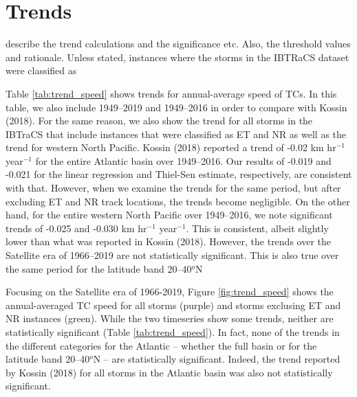 \documentclass[wcd,manuscript]{copernicus}
\begin{document}
\section{Trends}

describe the trend calculations and the significance etc. Also, the threshold values and rationale. Unless stated, instances where the storms in the IBTRaCS dataset were classified as



Table \ref{tab:trend_speed} shows trends for annual-average speed of TCs. In this table, we also include 1949--2019 and 1949--2016 in order to compare with Kossin (2018). For the same reason, we also show the trend for all storms in the IBTraCS that include instances that were classified as ET and NR as well as the trend for western North Pacific. Kossin (2018) reported a trend of -0.02 km hr$^{-1}$ year$^{-1}$ for the entire Atlantic basin over 1949--2016. Our results of -0.019 and -0.021 for the linear regression and Thiel-Sen estimate, respectively, are consistent with that. However, when we examine the trends for the same period, but after excluding ET and NR track locations, the trends become negligible. On the other hand, for the entire western North Pacific over 1949--2016, we note significant trends of  -0.025 and -0.030 km hr$^{-1}$ year$^{-1}$.  This is consistent, albeit slightly lower than what was reported in  Kossin (2018). However, the trends over the Satellite era of 1966--2019 are not statistically significant. This is also true over the same period for the latitude band 20--40$^o$N 

Focusing on the Satellite era of 1966-2019,  Figure \ref{fig:trend_speed}  shows the annual-averaged TC speed for all storms (purple) and storms exclusing ET and NR instances (green). While the two timeseries show some trends, neither are statistically significant (Table \ref{tab:trend_speed}).  In fact, none of the trends in the different categories for the Atlantic -- whether the full basin or for the latitude band 20--40$^o$N -- are statistically significant. Indeed, the trend reported by Kossin (2018) for all storms in the Atlantic basin was also not statistically significant. 
\end{document}
